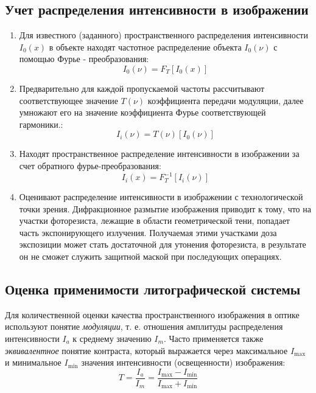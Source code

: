 \documentclass[14pt,a4paper]{extarticle}
\begin{document}
\subsection{Учет распределения интенсивности в изображении}
\begin{enumerate}
	\item Для известного (заданного) пространственного распределения интенсивности $I_0(x)$ в объекте находят частотное распределение объекта  $I_0(\nu)$ с помощью Фурье - преобразования:
	\begin{equation}
		I_0(\nu) = F_T [I_0(x)]
	\end{equation}
	\item Предварительно для каждой пропускаемой частоты рассчитывают соответствующее значение $T(\nu)$ коэффициента передачи модуляции, далее умножают его на значение коэффициента Фурье соответствующей гармоники.:
	\begin{equation}
		I_i(\nu) = T(\nu)[I_0(\nu)]
	\end{equation}

	\item Находят пространственное распределение интенсивности в изображении за счет обратного фурье-преобразования:
	\begin{equation}
		I_i(x) = F_T^{-1} [I_i(\nu)]
	\end{equation}
	\item Оценивают распределение интенсивности в изображении с технологической точки зрения. Дифракционное размытие изображения приводит к тому, что на участки фоторезиста, лежащие в области геометрической тени, попадает часть экспонирующего излучения. Получаемая этими участками доза экспозиции может стать достаточной для утонения фоторезиста, в результате он не сможет служить защитной маской при последующих операциях.
\end{enumerate}
\subsection{Оценка применимости литографической системы}
Для количественной оценки качества пространственного изображения в оптике используют
понятие \textit{модуляции}, т. е. отношения амплитуды распределения интенсивности $I_a$ к среднему
значению $I_m$. Часто применяется также \textit{эквивалентное }понятие контраста, который
выражается через максимальное $I_{\max}$ и минимальное $I_{\min}$ значения интенсивности (освещенности)
изображения:
\begin{equation}\label{eq:contrast}
	T = \frac{I_a}{I_m} = \frac{I_{\max}-I_{\min}}{I_{\max}+I_{\min}}
\end{equation}
\end{document}
